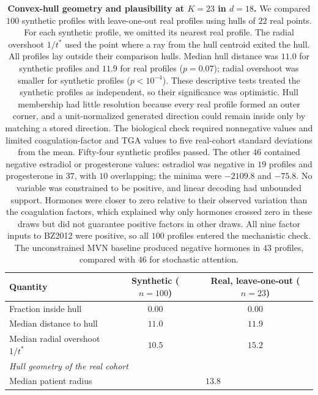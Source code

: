 \begin{table}[ht]
\centering
\caption{\textbf{Convex-hull geometry and plausibility at $K{=}23$ in $d{=}18$.}
We compared $100$ synthetic profiles with leave-one-out real profiles using hulls of $22$
real points. For each synthetic profile, we omitted its nearest real profile. The radial
overshoot $1/t^{*}$ used the point where a ray from the hull centroid exited the hull.
All profiles lay outside their comparison hulls. Median hull distance was $11.0$ for synthetic
profiles and $11.9$ for real profiles ($p{=}0.07$); radial overshoot was smaller for synthetic
profiles ($p<10^{-4}$). These descriptive tests treated the synthetic profiles as independent,
so their significance was optimistic. Hull membership had little resolution because every
real profile formed an outer corner, and a unit-normalized generated direction could remain
inside only by matching a stored direction.
The biological check required nonnegative values and limited coagulation-factor and TGA values
to five real-cohort standard deviations from the mean. Fifty-four synthetic profiles passed.
The other $46$ contained negative estradiol or progesterone values: estradiol was negative in
$19$ profiles and progesterone in $37$, with $10$ overlapping; the minima were $-2109.8$ and
$-75.8$. No variable was constrained to be positive, and linear decoding had unbounded support.
Hormones were closer to zero relative to their observed variation than the coagulation factors,
which explained why only hormones crossed zero in these draws but did not guarantee positive
factors in other draws. All nine factor inputs to BZ2012 were positive, so all $100$ profiles
entered the mechanistic check. The unconstrained MVN baseline produced negative hormones in
$43$ profiles, compared with $46$ for stochastic attention.}
\label{stab:hull-geometry}
{\small
\setlength{\tabcolsep}{5pt}
\begin{tabular}{lcc}
\toprule
Quantity & Synthetic ($n{=}100$) & Real, leave-one-out ($n{=}23$) \\
\midrule
Fraction inside hull                        & $0.00$ & $0.00$ \\
Median distance to hull                     & $11.0$ & $11.9$ \\
Median radial overshoot $1/t^{*}$           & $10.5$ & $15.2$ \\
\midrule
\multicolumn{3}{l}{\emph{Hull geometry of the real cohort}} \\
Median patient radius                       & \multicolumn{2}{c}{$13.8$} \\

\end{tabular}}
\end{table}
